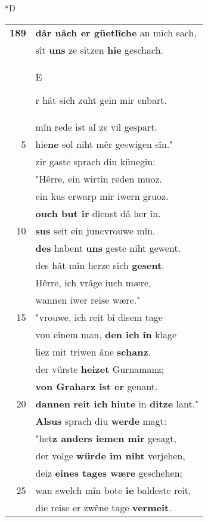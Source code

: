 \documentclass[8pt,a4paper,notitlepage]{article}
\begin{document}
\begin{table}[ht]
\begin{minipage}[t]{0.5\linewidth}
\small
\begin{center}*D
\end{center}
\begin{tabular}{rl}
\textbf{189} & \textbf{dâr nâch er güetlîche} an mich sach,\\ 
 & sît \textbf{uns} ze sitzen \textbf{hie} geschach.\\ 
 & \begin{large}E\end{large}r hât sich zuht gein mir enbart.\\ 
 & mîn rede ist al ze vil gespart.\\ 
5 & hie\textbf{ne} sol niht mêr geswigen sîn."\\ 
 & zir gaste sprach diu künegîn:\\ 
 & "Hêrre, ein wirtîn reden muoz.\\ 
 & ein kus erwarp mir iwern gruoz.\\ 
 & \textbf{ouch but ir} dienst dâ her în.\\ 
10 & \textbf{sus} seit ein juncvrouwe mîn.\\ 
 & \textbf{des} habent \textbf{uns} geste niht gewent.\\ 
 & des hât mîn herze sich \textbf{gesent}.\\ 
 & Hêrre, ich vrâge iuch mære,\\ 
 & wannen iwer reise wære."\\ 
15 & "vrouwe, ich reit bî disem tage\\ 
 & von einem man, \textbf{den ich} \textbf{in} klage\\ 
 & liez mit triwen âne \textbf{schanz}.\\ 
 & der vürste \textbf{heizet} Gurnamanz;\\ 
 & \textbf{von Graharz ist er} genant.\\ 
20 & \textbf{dannen} \textbf{reit ich} \textbf{hiute} in \textbf{ditze} lant."\\ 
 & \textbf{Alsus} sprach diu \textbf{werde} magt:\\ 
 & "het\textbf{z anders iemen mir} gesagt,\\ 
 & der volge \textbf{würde im niht} verjehen,\\ 
 & deiz \textbf{eines tages wære} geschehen;\\ 
25 & wan swelch mîn bote \textbf{ie} baldeste reit,\\ 
 & die reise er zwêne tage \textbf{vermeit}.\\ 

\end{tabular}
\end{minipage}
\end{table}
\end{document}
